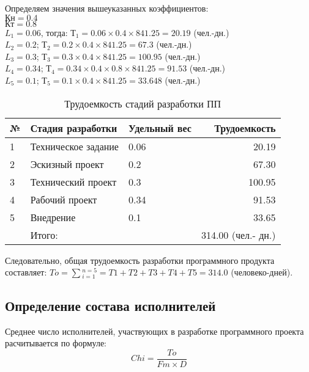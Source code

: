 \begin{par}
Определяем значения вышеуказанных коэффициентов: \\
$Кн = 0.4$ \\
$Кт = 0.8$ \\
$L_1 = 0.06$, тогда: $Т_1 = 0.06 \times{} 0.4 \times{} 841.25 = 20.19$ (чел.-дн.) \\
$L_2 = 0.2$; $Т_2 = 0.2 \times{} 0.4 \times{} 841.25 = 67.3$ (чел.-дн.) \\
$L_3 = 0.3$; $Т_3 = 0.3 \times{} 0.4 \times{} 841.25 = 100.95$ (чел.-дн.) \\
$L_4 = 0.34$; $Т_4 = 0.34 \times{} 0.4 \times{} 0.8 \times{} 841.25 = 91.53$ (чел.-дн.) \\
$L_5 = 0.1$; $Т_5 = 0.1 \times{} 0.4 \times{} 841.25 = 33.648$ (чел.-дн.)
\end{par}

\begin{par}
\begin{table}
\caption{Трудоемкость стадий разработки ПП}
\begin{tabular}{|l|p{7cm}|p{4cm}|r|}
\hline{}
№ & Стадия разработки & Удельный вес & Трудоемкость \\
\hline{}
1 & Техническое задание & 0.06 &  20.19 \\
\hline{}
2 & Эскизный проект & 0.2 & 67.30 \\
\hline{}
3 & Технический проект & 0.3 & 100.95 \\
\hline{}
4 & Рабочий проект & 0.34 & 91.53 \\
\hline{}
5 & Внедрение & 0.1 & 33.65 \\
\hline{}
& Итого: & & 314.00 (чел.- дн.) \\
\hline
\end{tabular}
\label{table:trdSoftDev}
\end{table}
Следовательно, общая трудоемкость разработки программного продукта
составляет: $To = \sum{}_{i=1}^{n=5} = T1 + T2 + T3 + T4 + T5 = 314.0$ (человеко-дней).
\end{par}


\subsection{Определение состава исполнителей}
Среднее число исполнителей, участвующих в разработке программного проекта расчитывается по формуле:
\begin{equation}
    Chi=\frac{To}{Fm\times{}D}
\end{equation}

